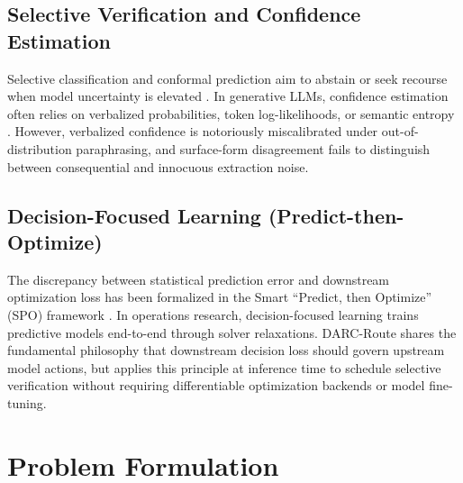 \documentclass[conference]{IEEEtran}
\begin{document}
\subsection{Selective Verification and Confidence Estimation}
Selective classification and conformal prediction aim to abstain or seek recourse when model uncertainty is elevated \cite{geifman2017selective, kamath2020selective}. In generative LLMs, confidence estimation often relies on verbalized probabilities, token log-likelihoods, or semantic entropy \cite{varshney2023stitch, mishra2024calibrated}. However, verbalized confidence is notoriously miscalibrated under out-of-distribution paraphrasing, and surface-form disagreement fails to distinguish between consequential and innocuous extraction noise.

\subsection{Decision-Focused Learning (Predict-then-Optimize)}
The discrepancy between statistical prediction error and downstream optimization loss has been formalized in the Smart ``Predict, then Optimize'' (SPO) framework \cite{elmachtoub2022smart}. In operations research, decision-focused learning trains predictive models end-to-end through solver relaxations. DARC-Route shares the fundamental philosophy that downstream decision loss should govern upstream model actions, but applies this principle at inference time to schedule selective verification without requiring differentiable optimization backends or model fine-tuning.

\section{Problem Formulation}
\end{document}
